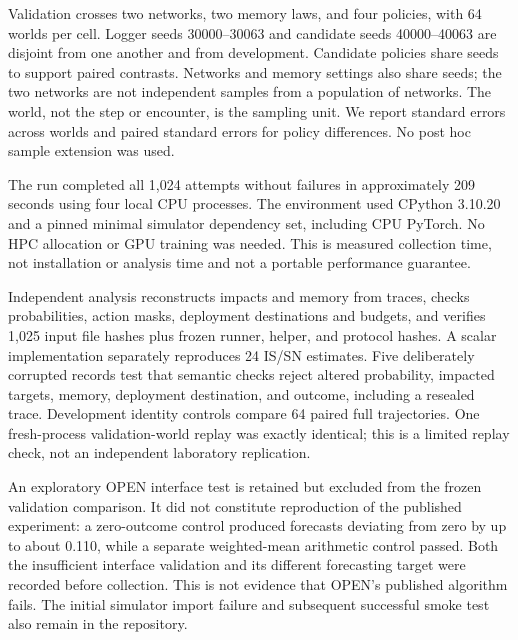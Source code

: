 \documentclass[sigconf,nonacm]{acmart}
\begin{document}
Validation crosses two networks, two memory laws, and four policies, with 64 worlds per cell. Logger seeds 30000--30063 and candidate seeds 40000--40063 are disjoint from one another and from development. Candidate policies share seeds to support paired contrasts. Networks and memory settings also share seeds; the two networks are not independent samples from a population of networks. The world, not the step or encounter, is the sampling unit. We report standard errors across worlds and paired standard errors for policy differences. No post hoc sample extension was used.

The run completed all 1,024 attempts without failures in approximately 209 seconds using four local CPU processes. The environment used CPython 3.10.20 and a pinned minimal simulator dependency set, including CPU PyTorch. No HPC allocation or GPU training was needed. This is measured collection time, not installation or analysis time and not a portable performance guarantee.

Independent analysis reconstructs impacts and memory from traces, checks probabilities, action masks, deployment destinations and budgets, and verifies 1,025 input file hashes plus frozen runner, helper, and protocol hashes. A scalar implementation separately reproduces 24 IS/SN estimates. Five deliberately corrupted records test that semantic checks reject altered probability, impacted targets, memory, deployment destination, and outcome, including a resealed trace. Development identity controls compare 64 paired full trajectories. One fresh-process validation-world replay was exactly identical; this is a limited replay check, not an independent laboratory replication.

An exploratory OPEN interface test is retained but excluded from the frozen validation comparison. It did not constitute reproduction of the published experiment: a zero-outcome control produced forecasts deviating from zero by up to about 0.110, while a separate weighted-mean arithmetic control passed. Both the insufficient interface validation and its different forecasting target were recorded before collection. This is not evidence that OPEN's published algorithm fails. The initial simulator import failure and subsequent successful smoke test also remain in the repository.
\end{document}
